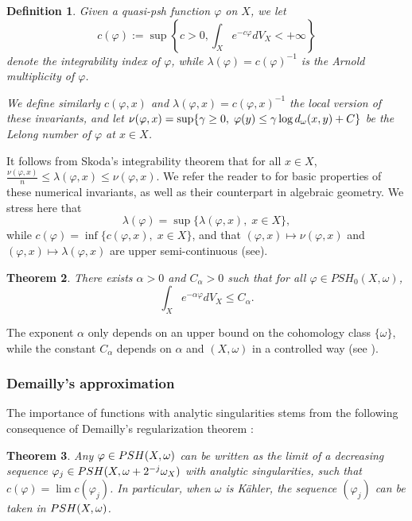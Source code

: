 \documentclass[10pt,a4paper]{amsart}
\numberwithin{equation}{section}
\newtheorem{theorem}{Theorem}[section]
\newtheorem{defi}[theorem]{Definition}
\newcommand{\PSH}{\textup{PSH}}
\newcommand{\f}{\varphi}
\newcommand \la {\lambda}
\begin{document}
\begin{defi}
Given a quasi-psh function $\f$ on $X$, we let 
$$
c(\f):=\sup \left\{c>0, \int_X e^{-c\f} dV_X <+\infty \right\}
$$
denote the integrability index of $\f$, while $\la(\f)=c(\f)^{-1}$ is the Arnold multiplicity of $\f$.

We define similarly $c(\f,x)$ and $\la(\f,x)=c(\f,x)^{-1}$ the local version of these invariants,
and let $\nu(\f,x)=\sup \{ \gamma \geq 0, \; \f(y) \leq \gamma \log {\rm d}_{\omega}(x,y)+C \}$
be the Lelong number of $\f$ at $x \in X$.
\end{defi}



It follows from Skoda's integrability theorem \cite[Theorem 2.50]{GZbook} that for all $x \in X$,
$
\frac{\nu(\f,x)}{n} \leq \la(\f,x) \leq \nu(\f,x).
$
We refer the reader to \cite{DK01,GZbook} for basic properties of these numerical invariants, 
as well as their counterpart in algebraic geometry. We  stress here that
$$
\la(\f)=\sup \{ \la(\f,x), \; x \in X \},
$$
while $c(\f)=\inf \{ c(\f,x), \; x \in X \}$,
and that $(\f,x) \mapsto \nu(\f,x)$  
and $(\f,x) \mapsto \la(\f,x)$ are upper semi-continuous (see\cite[Main theorem]{DK01}).

 
\begin{theorem} \label{thm:skoda}
There exists $\alpha>0$ and $C_{\alpha} >0$ such that for all $\f \in PSH_0(X,\omega)$,
$$
\int_X e^{-\alpha \f} dV_X \leq C_{\alpha}.
$$
\end{theorem}

The exponent $\alpha$ only depends on an upper bound on the cohomology class $\{\omega\}$, while
the constant $C_{\alpha}$ depends on $\alpha$ and $(X,\omega)$ in a controlled way
(see \cite[Theorem 2.9]{DGG23}).

 
\subsubsection*{Demailly's approximation}

The importance of functions with analytic singularities stems from the following consequence of 
Demailly's regularization theorem \cite{DPS01}: 

\begin{theorem} \label{thm:Demreg} 
Any $\f\in\PSH(X,\omega)$ can be written as the limit of a decreasing sequence $\f_j\in\PSH(X,\omega+2^{-j}\omega_X)$ with analytic singularities, 
such that $c(\f)=\lim c(\f_j)$. In particular, when $\omega$ is K\"ahler, the sequence $(\varphi_j)$ can be taken in $\PSH(X,\omega)$. 
\end{theorem}
\end{document}
